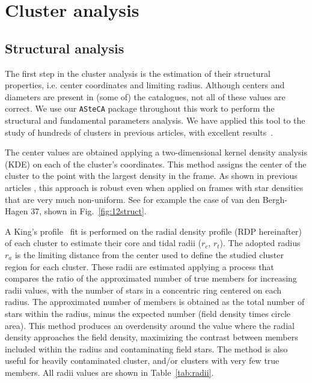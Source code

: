 \documentclass[referee]{aa}
\begin{document}
\section{Cluster analysis}
 \label{sec:clust_analy}

 \subsection{Structural analysis}

  The first step in the cluster analysis is the estimation of their structural
  properties, i.e. center coordinates and limiting radius. Although centers and
  diameters are present in (some of) the catalogues, not all of these values are
  correct. We use our \texttt{ASteCA} package throughout this
  work to perform the structural and fundamental parameters analysis. We have
  applied this tool to the study of hundreds of clusters in previous articles,
  with excellent results~\citep{Perren_2017,Perren_2020}.

  The center values are obtained applying a two-dimensional kernel density
  analysis (KDE) on each of the cluster's coordinates. This method assigns the
  center of the cluster to the point with the largest density in the frame. As
  shown in previous articles \citep{Perren_2015,Perren_2017,Perren_2020}, this
  approach is robust even when applied on frames with star densities that
  are very much non-uniform. See for example the case of van den Bergh-Hagen 37,
  shown in Fig.~\ref{fig:12struct}.

  A King's profile~\citep{King_1962} fit is performed on the radial
  density profile (RDP hereinafter) of each cluster to estimate their core and
  tidal radii ($r_{c}$, $r_{t}$). The adopted radius $r_{a}$ is the limiting
  distance from the center used to define the studied cluster region for each
  cluster. These radii are estimated applying a process that compares the
  ratio of the approximated number of true members for increasing radii values,
  with the number of stars in a concentric ring centered on each radius. The
  approximated number of members is obtained as the total number of stars within
  the radius, minus the expected number (field density times circle area). This
  method produces an overdensity around the value where the radial density
  approaches the field density, maximizing the contrast between members included
  within the radius and contaminating field stars. The method is also useful
  for heavily contaminated cluster, and/or clusters with very few true
  members. All radii values are shown in Table~\ref{tab:radii}.\\
\end{document}
